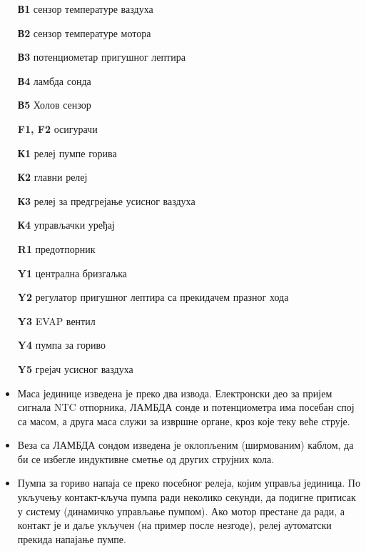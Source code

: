 \documentclass{report}
\begin{document}
\begin{itemize}[leftmargin=1.6cm, labelwidth=0.7 cm, labelsep=0.3cm, align=left, itemsep=0pt]
    \item[\textbf{В1}] сензор температуре ваздуха
    \item[\textbf{В2}] сензор температуре мотора
    \item[\textbf{В3}] потенциометар пригушног лептира
    \item[\textbf{В4}] ламбда сонда
    \item[\textbf{В5}] Холов сензор
    \item[\textbf{F1, F2}] осигурачи
    \item[\textbf{К1}] релеј пумпе горива
    \item[\textbf{К2}] главни релеј
    \item[\textbf{К3}] релеј за предгрејање усисног ваздуха
    \item[\textbf{К4}] управљачки уређај
    \item[\textbf{R1}] предотпорник
    \item[\textbf{Y1}] централна бризгаљка
    \item[\textbf{Y2}] регулатор пригушног лептира са прекидачем празног хода
    \item[\textbf{Y3}] EVAP вентил
    \item[\textbf{Y4}] пумпа за гориво
    \item[\textbf{Y5}] грејач усисног ваздуха
\end{itemize}

\begin{kljucno}
      \begin{itemize}
    \item Маса јединице изведена је преко два извода. Електронски део за пријем
          сигнала NTC отпорника, ЛАМБДА сонде и потенциометра има посебан спој
          са масом, а друга маса служи за извршне органе, кроз које теку веће
          струје.
    \item Веза са ЛАМБДА сондом изведена је оклопљеним (ширмованим) каблом,
          да би се избегле индуктивне сметње од других струјних кола.
    \item Пумпа за гориво напаја се преко посебног релеја, којим управља
          јединица. По укључењу контакт-кључа пумпа ради неколико секунди, да
          подигне притисак у систему (динамичко управљање пумпом). Ако мотор
          престане да ради, а контакт је и даље укључен (на пример после
          незгоде), релеј аутоматски прекида напајање пумпе.
\end{itemize}
\end{kljucno}
\end{document}
